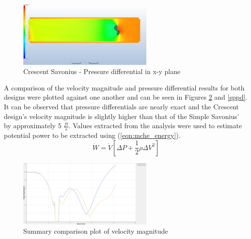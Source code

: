 \documentclass[12pt]{article}
\begin{document}
\begin{figure}[H]
\begin{center}
\includegraphics[width=0.6\textwidth]{CFD_Results/C_P}
\caption[p1] {Crescent Savonius - Pressure differential in x-y plane}
\label{cp}
\end{center}
\end{figure}
\hspace{0.5 in}A comparison of the velocity magnitude and pressure differential results for both designs were plotted against one another and can be seen in Figures \ref{spvm} and \ref{sppd}. It can be observed that pressure differentials are nearly exact and the Crescent design's velocity magnitude is slightly higher than that of the Simple Savonius' by approximately 5 $\frac{ft}{s}$. Values extracted from the analysis were used to estimate potential power to be extracted using (\ref{eqn:mche_energy}).
\vspace{-0.1 in}
\begin{equation}
\dot{W} = \dot{V}[{\Delta P}+\frac{1}{2}\rho \Delta V^2]
\label{eqn:mche_energy}
\end{equation}
\vspace{-0.2 in}
\begin{figure}[H]
\begin{center}
\includegraphics[width=0.6\textwidth]{spvm}
\caption[p1] {Summary comparison plot of velocity magnitude}
\label{spvm}
\end{center}
\end{figure}
\end{document}
